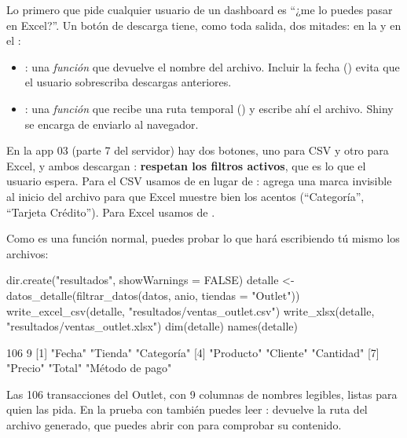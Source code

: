 Lo primero que pide cualquier usuario de un dashboard es ``¿me lo puedes
pasar en Excel?''. Un botón de descarga tiene, como toda salida, dos mitades:
 en la  y
 en el
:

\begin{itemize}
  \item {}: una \emph{función} que devuelve el nombre del
        archivo. Incluir la fecha () evita que el usuario
        sobrescriba descargas anteriores.
  \item {}: una \emph{función} que recibe una ruta temporal
        () y escribe ahí el archivo. Shiny se encarga de
        enviarlo al navegador.
\end{itemize}

En la app 03 (parte 7 del servidor) hay dos botones, uno para CSV y otro
para Excel, y ambos descargan :
\textbf{respetan los filtros activos}, que es lo que el usuario espera.
Para el CSV usamos  de  en lugar
de : agrega una marca invisible al inicio del archivo
para que Excel muestre bien los acentos (``Categoría'', ``Tarjeta
Crédito''). Para Excel usamos  de .

Como  es una función normal, puedes probar lo que hará
escribiendo tú mismo los archivos:

\begin{rcode}
dir.create("resultados", showWarnings = FALSE)
detalle <- datos_detalle(filtrar_datos(datos, anio, tiendas = "Outlet"))
write_excel_csv(detalle, "resultados/ventas_outlet.csv")
write_xlsx(detalle, "resultados/ventas_outlet.xlsx")
dim(detalle)
names(detalle)
\end{rcode}
\begin{rsalida}
[1] 106   9
[1] "Fecha"          "Tienda"         "Categoría"     
[4] "Producto"       "Cliente"        "Cantidad"      
[7] "Precio"         "Total"          "Método de pago"
\end{rsalida}

Las 106 transacciones del Outlet, con 9 columnas de nombres legibles, listas
para quien las pida. En la prueba con  también puedes
leer : devuelve la ruta del archivo generado,
que puedes abrir con  para comprobar su contenido.

